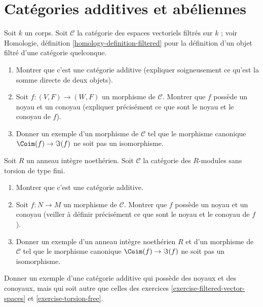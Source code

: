 \section{Catégories additives et abéliennes}
\label{section-additive}

\begin{exercise}
\label{exercise-filtered-vector-spaces}
Soit $k$ un corps. Soit $\mathcal{C}$ la catégorie des espaces vectoriels filtrés
sur $k$ ; voir
Homologie, définition \ref{homology-definition-filtered}
pour la définition d'un objet filtré d'une catégorie quelconque.
\begin{enumerate}
\item Montrer que c'est une catégorie additive (expliquer soigneusement ce qu'est la
somme directe de deux objets).
\item Soit $f : (V, F) \to (W, F)$ un morphisme de $\mathcal{C}$.
Montrer que $f$ possède un noyau et un conoyau (expliquer précisément
ce que sont le noyau et le conoyau de $f$).
\item Donner un exemple d'un morphisme de $\mathcal{C}$ tel que
le morphisme canonique $\Coim(f) \to \Im(f)$ ne soit pas un isomorphisme.
\end{enumerate}
\end{exercise}

\begin{exercise}
\label{exercise-torsion-free}
Soit $R$ un anneau intègre noethérien. Soit $\mathcal{C}$ la catégorie des
$R$-modules sans torsion de type fini.
\begin{enumerate}
\item Montrer que c'est une catégorie additive.
\item Soit $f : N \to M$ un morphisme de $\mathcal{C}$.
Montrer que $f$ possède un noyau et un conoyau (veiller à définir précisément
ce que sont le noyau et le conoyau de $f$).
\item Donner un exemple d'un anneau intègre noethérien $R$ et d'un morphisme de
$\mathcal{C}$ tel que le morphisme canonique $\Coim(f) \to \Im(f)$
ne soit pas un isomorphisme.
\end{enumerate}
\end{exercise}

\begin{exercise}
\label{exercise-other}
Donner un exemple d'une catégorie additive qui possède des noyaux
et des conoyaux, mais qui soit autre que celles des
exercices \ref{exercise-filtered-vector-spaces} et
\ref{exercise-torsion-free}.
\end{exercise}





